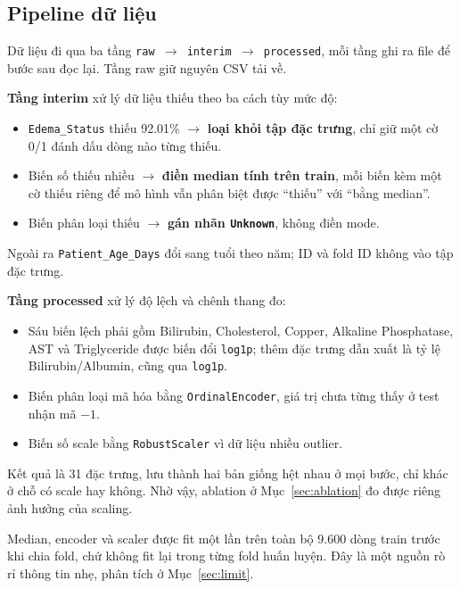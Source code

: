 \documentclass[12pt]{template/ai_conquer2026}
\begin{document}
\subsection{Pipeline dữ liệu}
\label{sec:pipeline}

Dữ liệu đi qua ba tầng \texttt{raw $\rightarrow$ interim $\rightarrow$ processed},
mỗi tầng ghi ra file để bước sau đọc lại. Tầng raw giữ nguyên CSV tải về.

\noindent\textbf{Tầng interim} xử lý dữ liệu thiếu theo ba cách tùy mức độ:

\begin{itemize}
\item \texttt{Edema\_Status} thiếu 92.01\% $\rightarrow$ \textbf{loại khỏi tập đặc
trưng}, chỉ giữ một cờ 0/1 đánh dấu dòng nào từng thiếu.
\item Biến số thiếu nhiều $\rightarrow$ \textbf{điền median tính trên train}, mỗi
biến kèm một cờ thiếu riêng để mô hình vẫn phân biệt được ``thiếu'' với ``bằng
median''.
\item Biến phân loại thiếu $\rightarrow$ \textbf{gán nhãn \texttt{Unknown}}, không
điền mode.
\end{itemize}

\noindent Ngoài ra \texttt{Patient\_Age\_Days} đổi sang tuổi theo năm; ID và fold
ID không vào tập đặc trưng.

\noindent\textbf{Tầng processed} xử lý độ lệch và chênh thang đo:

\begin{itemize}
\item Sáu biến lệch phải gồm Bilirubin, Cholesterol, Copper, Alkaline
Phosphatase, AST và Triglyceride được biến đổi \texttt{log1p}; thêm đặc trưng dẫn
xuất là tỷ lệ Bilirubin/Albumin, cũng qua \texttt{log1p}.
\item Biến phân loại mã hóa bằng \texttt{OrdinalEncoder}, giá trị chưa từng thấy ở
test nhận mã $-1$.
\item Biến số scale bằng \texttt{RobustScaler} vì dữ liệu nhiều outlier.
\end{itemize}

\noindent Kết quả là 31 đặc trưng, lưu thành hai bản giống hệt nhau ở mọi bước,
chỉ khác ở chỗ có scale hay không. Nhờ vậy, ablation ở Mục~\ref{sec:ablation} đo
được riêng ảnh hưởng của scaling.

Median, encoder và scaler được fit một lần trên toàn bộ 9.600 dòng train trước khi
chia fold, chứ không fit lại trong từng fold huấn luyện. Đây là một nguồn rò rỉ
thông tin nhẹ, phân tích ở Mục~\ref{sec:limit}.
\end{document}
